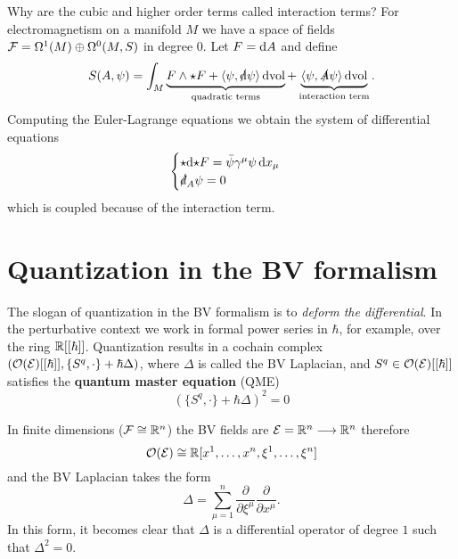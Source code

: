 \begin{example}
  Why are the cubic and higher order terms called interaction terms? For electromagnetism on a manifold $M$ we have a space of fields
  $\mathcal{F} = \Omega^1(M) \oplus \Omega^0(M, S)$ in degree $0$. Let $F = \mathrm{d} A$ and define
  \begin{equation*}
    S(A, \psi) = \int_M
    \underbrace{F \wedge {\star} F
    + \langle \psi, \slashed{\mathrm{d}} \psi \rangle \, \mathrm{d} \mathrm{vol}}_{\text{quadratic terms}}
    + \underbrace{\langle \psi, \slashed{A} \psi \rangle \, \mathrm{d} \mathrm{vol}}_{\text{interaction term}}.
  \end{equation*}
  Computing the Euler-Lagrange equations we obtain the system of differential equations
  \begin{equation*}
    \begin{cases}
      {\star} \mathrm{d} {\star} F = \bar{\psi} \gamma^\mu \psi \, \mathrm{d} x_\mu \\
      \slashed{d}_A \psi = 0
    \end{cases}
  \end{equation*}
  which is coupled because of the interaction term.
\end{example}

\section{Quantization in the BV formalism}

The slogan of quantization in the BV formalism is to \emph{deform the differential}. In the perturbative context we work in formal power series in $\hbar$, for example, over the ring $\mathbb{R}[[\hbar]]$. Quantization results in a cochain complex
$(\mathcal{O}(\mathcal{E})[[\hbar]], \{S^q, \cdot\} + \hbar \Delta)$, where $\Delta$ is called the BV Laplacian, and 
$S^q \in \mathcal{O}(\mathcal{E})[[\hbar]]$ satisfies the \textbf{quantum master equation} (QME)
\begin{equation}
  \label{eq:qme}
  (\{S^q, \cdot \} + \hbar \Delta)^2 = 0
\end{equation}

\begin{example}
  In finite dimensions ($\mathcal{F} \cong \mathbb{R}^n$) the BV fields are
  $\mathcal{E} = \mathbb{R}^n \longrightarrow \mathbb{R}^n$
  therefore
  \begin{equation*}
    \mathcal{O}(\mathcal{E}) \cong \mathbb{R} [x^1, \dots, x^n, \xi^1, \dots, \xi^n]
  \end{equation*}
  and the BV Laplacian takes the form
  \begin{equation*}
    \Delta = \sum_{\mu = 1}^n \frac{\partial}{\partial \xi^\mu} \frac{\partial}{\partial x^\mu}.
  \end{equation*}
  In this form, it becomes clear that $\Delta$ is a differential operator of degree $1$ such that $\Delta^2 = 0$.
\end{example}

